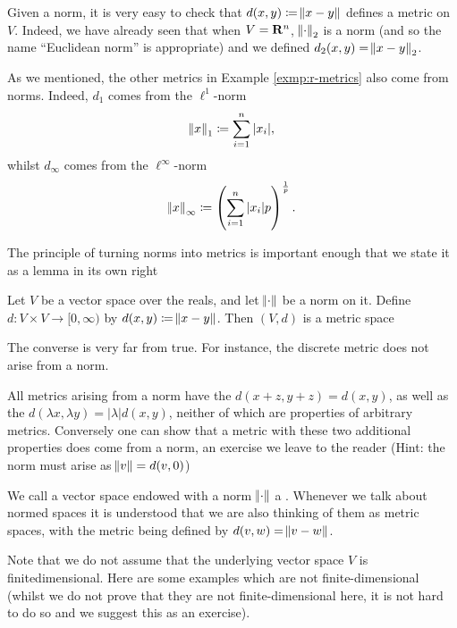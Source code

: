 Given a norm, it is very easy to check that $d(x,y)\coloneqq\norm{x-y}$ defines a metric on $V$. Indeed, we have already seen that when $V=\mathbf R^n$, $\norm{\cdot}_2$ is a norm (and so the name ``Euclidean norm'' is appropriate) and we defined $d_2(x,y)=\norm{x-y}_2$.

As we mentioned, the other metrics in Example \ref{exmp:r-metrics} also come from norms. Indeed, $d_1$ comes from the $\ell^1$-norm
\[\norm{x}_1\coloneqq\sum_{i=1}^n|x_i|,\]
whilst $d_\infty$ comes from the $\ell^\infty$-norm
\[\norm{x}_\infty\coloneqq\left(\sum_{i=1}^n|x_i|p\right)^\frac{1}{p}.\]


The principle of turning norms into metrics is important enough that we state it as a lemma in its own right

\begin{lemma}
Let $V$ be a vector space over the reals, and let $\norm{\cdot}$ be a norm on it. Define $d:V\times V\to[0,\infty)$ by $d(x,y)\coloneqq\norm{x-y}$. Then $(V,d)$ is a metric space
\end{lemma}

\begin{remark}
The converse is very far from true. For instance, the discrete metric does not arise from a norm.
\end{remark}

All metrics arising from a norm
have the  $d(x+z,y+z)=d(x,y)$, as well as the  $d(\lambda x,\lambda y)=|\lambda|d(x,y)$, neither of which are properties of arbitrary metrics. Conversely one can show that a metric with these two additional properties does come from a norm, an exercise we leave to the reader (Hint: the norm must arise as $\norm{v}=d(v,0)$)


We call a vector space endowed with a norm $\norm{\cdot}$ a . Whenever we talk about normed spaces it is understood that we are also thinking of them as metric spaces, with the metric being defined by $d(v,w)=\norm{v-w}$.

Note that we do not assume that the underlying vector space $V$ is finitedimensional. Here are some examples which are not finite-dimensional (whilst we do not prove that they are not finite-dimensional here, it is not hard to do so and we suggest this as an exercise).

